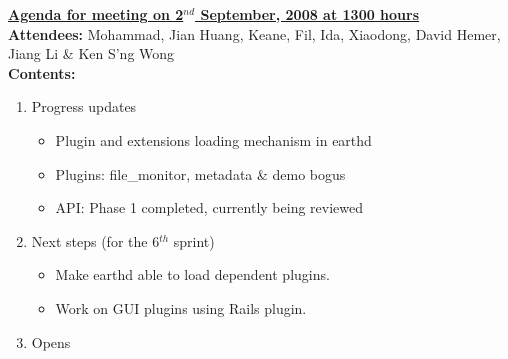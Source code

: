 \documentclass{letter}
\begin{document}
{\large \textbf{\underline{Agenda for meeting on 2$^{nd}$ September, 2008 at 1300 hours}}}\\

\textbf{Attendees:} Mohammad, Jian Huang, Keane, Fil, Ida, Xiaodong, David Hemer, Jiang Li \& Ken S'ng Wong \\

\textbf{Contents:}

\begin{enumerate}
	\item Progress updates
		\begin{itemize}
			\item Plugin and extensions loading mechanism in earthd
			\item Plugins: file\_monitor, metadata \& demo bogus
			  \item API: Phase 1 completed, currently being reviewed
		\end{itemize}
	\item Next steps (for the 6$^{th}$ sprint)
		\begin{itemize}
			\item Make earthd able to load dependent plugins.
			\item Work on GUI plugins using Rails plugin.
		\end{itemize}
	\item Opens
\end{enumerate}
\end{document}
